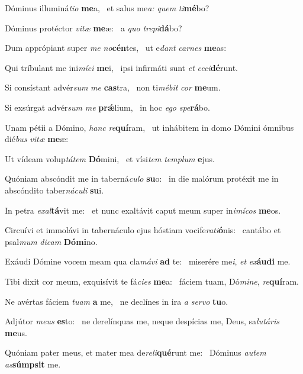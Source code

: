 \item Dóminus illuminá\textit{tio} \textbf{me}a,~\psstar{} et salus me\textit{a:} \textit{quem} \textit{ti}\textbf{mé}bo?
\item Dóminus protéctor \textit{vitæ} \textbf{me}æ:~\psstar{} a \textit{quo} \textit{trepi}\textbf{dá}bo?
\item Dum apprópiant super \textit{me} \textit{no}\textbf{cén}tes,~\psstar{} ut e\textit{dant} \textit{carnes} \textbf{me}as:
\item Qui tríbulant me ini\textit{míci} \textbf{me}i,~\psstar{} ipsi infirmáti sunt \textit{et} \textit{ceci}\textbf{dé}runt.
\item Si consístant advér\textit{sum} \textit{me} \textbf{cas}tra,~\psstar{} non ti\textit{mébit} \textit{cor} \textbf{me}um.
\item Si exsúrgat advér\textit{sum} \textit{me} \textbf{prǽ}lium,~\psstar{} in hoc \textit{ego} \textit{spe}\textbf{rá}bo.
\item Unam pétii a Dómino, \textit{hanc} \textit{re}\textbf{quí}ram,~\psstar{} ut inhábitem in domo Dómini ómnibus dié\textit{bus} \textit{vitæ} \textbf{me}æ:
\item Ut vídeam volup\textit{tátem} \textbf{Dó}mini,~\psstar{} et vísi\textit{tem} \textit{templum} \textbf{e}jus.
\item Quóniam abscóndit me in taberná\textit{culo} \textbf{su}o:~\psstar{} in die malórum protéxit me in abscóndito taber\textit{náculi} \textbf{su}i.
\item In petra \textit{exal}\textbf{tá}vit me:~\psstar{} et nunc exaltávit caput meum super in\textit{imícos} \textbf{me}os.
\item Circuívi et immolávi in tabernáculo ejus hóstiam vocife\textit{rati}\textbf{ó}nis:~\psstar{} cantábo et psal\textit{mum} \textit{dicam} \textbf{Dó}\textbf{mi}no.
\item Exáudi Dómine vocem meam qua cla\textit{mávi} \textbf{ad} te:~\psstar{} miserére me\textit{i}, \textit{et} \textit{ex}\textbf{áu}\textbf{di} me.
\item Tibi dixit cor meum, exquisívit te fá\textit{cies} \textbf{me}a:~\psstar{} fáciem tuam, Dó\textit{mine}, \textit{re}\textbf{quí}ram.
\item Ne avértas fáciem \textit{tuam} \textbf{a} me,~\psstar{} ne declínes in ira \textit{a} \textit{servo} \textbf{tu}o.
\item Adjútor \textit{meus} \textbf{es}to:~\psstar{} ne derelínquas me, neque despícias me, Deus, sa\textit{lutáris} \textbf{me}us.
\item Quóniam pater meus, et mater mea de\textit{reli}\textbf{qué}runt me:~\psstar{} Dóminus \textit{autem} \textit{as}\textbf{súmp}\textbf{sit} me.
